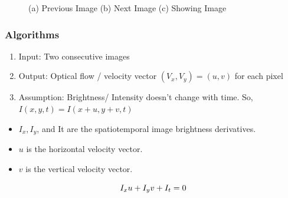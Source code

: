 \begin{figure}
    \centering
    \caption{(a) Previous Image (b) Next Image (c) Showing Image}
    \label{fig:Ch04007}
\end{figure}

\subsubsection{Algorithms}
\begin{enumerate}
    \item Input: Two consecutive images
    \item Output: Optical flow / velocity vector $(V_x, V_y) = (u, v)$ for each pixel
    \item Assumption: Brightness/ Intensity doesn’t change with time. So, $I(x, y, t) = I(x + u, y + v, t)$
\end{enumerate}

\begin{itemize}
    \item $I_x, I_y$, and It are the spatiotemporal image brightness derivatives.
    \item $u$ is the horizontal velocity vector.
    \item $v$ is the vertical velocity vector.
\end{itemize}
\[\huge I_xu+I_yv+I_t=0\]

